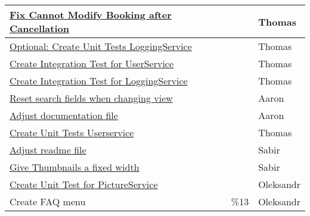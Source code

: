 \begin{table}[h]
\begin{tabular}{|p{}|p{1cm}|p{}|}
    \hline
	\href{https://gitlab.rz.uni-bamberg.de/swt/teaching/2021-ws/swt-swl-b/group-a/-/issues/170}{Fix Cannot Modify Booking after Cancellation} &   & Thomas \\

    \hline
	\href{https://gitlab.rz.uni-bamberg.de/swt/teaching/2021-ws/swt-swl-b/group-a/-/issues/138}{Optional: Create Unit Tests LoggingService} &   & Thomas \\

    \hline
	\href{https://gitlab.rz.uni-bamberg.de/swt/teaching/2021-ws/swt-swl-b/group-a/-/issues/166}{Create Integration Test for UserService} &   & Thomas \\

    \hline
	\href{https://gitlab.rz.uni-bamberg.de/swt/teaching/2021-ws/swt-swl-b/group-a/-/issues/162}{Create Integration Test for LoggingService} &   & Thomas \\

    \hline
	\href{https://gitlab.rz.uni-bamberg.de/swt/teaching/2021-ws/swt-swl-b/group-a/-/issues/148}{Reset search fields when changing view} &   & Aaron \\

    \hline
	\href{https://gitlab.rz.uni-bamberg.de/swt/teaching/2021-ws/swt-swl-b/group-a/-/issues/42}{Adjust documentation file} &   & Aaron \\

    \hline
	\href{https://gitlab.rz.uni-bamberg.de/swt/teaching/2021-ws/swt-swl-b/group-a/-/issues/72}{Create Unit Tests Userservice} &   & Thomas \\

    \hline
	\href{https://gitlab.rz.uni-bamberg.de/swt/teaching/2021-ws/swt-swl-b/group-a/-/issues/44}{Adjust readme file} &   & Sabir \\

    \hline
	\href{https://gitlab.rz.uni-bamberg.de/swt/teaching/2021-ws/swt-swl-b/group-a/-/issues/156}{Give Thumbnails a fixed width} &   & Sabir \\

    \hline
	\href{https://gitlab.rz.uni-bamberg.de/swt/teaching/2021-ws/swt-swl-b/group-a/-/issues/119}{Create Unit Test for PictureService} &   & Oleksandr \\
    \hline

	{Create FAQ menu} & \%13  & Oleksandr \\
    \hline

\end{tabular}
\end{table}